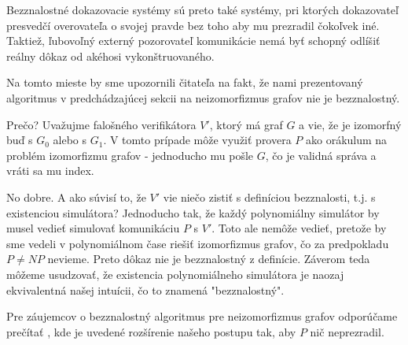Bezznalostné dokazovacie systémy sú preto také systémy, pri ktorých
dokazovateľ presvedčí overovateľa o svojej pravde bez toho aby mu
prezradil čokoľvek iné. Taktiež, ľubovoľný externý pozorovateľ
komunikácie nemá byť schopný odlíšiť reálny dôkaz od akéhosi
vykonštruovaného.


\begin{poznamka}
    Na tomto mieste by sme upozornili čitateľa na fakt, že nami
    prezentovaný algoritmus v predchádzajúcej sekcii na neizomorfizmus grafov
    nie je bezznalostný.
    
    Prečo? Uvažujme falošného verifikátora $V'$,
    ktorý má graf $G$ a vie, že je izomorfný buď s $G_0$ alebo s
    $G_1$. V tomto prípade môže využiť provera $P$ ako orákulum na
    problém izomorfizmu grafov - jednoducho mu pošle $G$, čo je
    validná správa a vráti sa mu index.

    No dobre. A ako súvisí to, že $V'$ vie niečo zistiť s definíciou
    bezznalosti, t.j. s existenciou simulátora? Jednoducho tak, že
    každý polynomiálny simulátor by musel vedieť simulovať komunikáciu
    $P$ s $V'$. Toto ale nemôže vedieť, pretože by sme vedeli v
    polynomiálnom čase riešiť izomorfizmus grafov, čo za predpokladu
    $P\neq NP$ nevieme. Preto dôkaz nie je bezznalostný z definície.
    Záverom teda môžeme usudzovať, že existencia polynomiálneho
    simulátora je naozaj ekvivalentná našej intuícii, čo to znamená
    "bezznalostný".

    Pre záujemcov o bezznalostný algoritmus pre neizomorfizmus grafov
    odporúčame prečítať \cite{nig}, kde je uvedené rozšírenie našeho
    postupu tak, aby $P$ nič neprezradil.
\end{poznamka}
